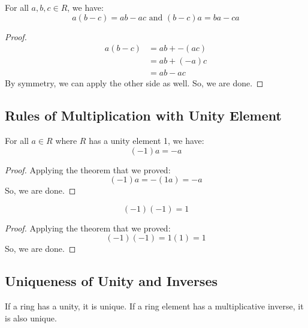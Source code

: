 \documentclass[letterpaper]{article}
\begin{document}
\begin{theorem}{}{}
    For all $a, b, c \in R$, we have: 
    \[a(b - c) = ab - ac \text{ and } (b - c)a = ba - ca\]
\end{theorem}

\begin{mdframed}[]
    \begin{proof}
        \begin{equation*}
            \begin{aligned}
                a(b - c) &= ab + -(ac) \\ 
                    &= ab + (-a)c \\ 
                    &= ab - ac
            \end{aligned}
        \end{equation*}
        By symmetry, we can apply the other side as well. So, we are done. 
    \end{proof}
\end{mdframed}

\subsection{Rules of Multiplication with Unity Element}
\begin{theorem}{}{}
    For all $a \in R$ where $R$ has a unity element 1, we have: 
    \[(-1)a = -a\]
\end{theorem}

\begin{mdframed}[]
    \begin{proof}
        Applying the theorem that we proved:
        \[(-1)a = -(1a) = -a\]
        So, we are done. 
    \end{proof}
\end{mdframed}

\begin{theorem}{}{}
    \[(-1)(-1) = 1\]
\end{theorem}

\begin{mdframed}[]
    \begin{proof}
        Applying the theorem that we proved:
        \[(-1)(-1) = 1(1) = 1\]
        So, we are done.
    \end{proof}
\end{mdframed}

\subsection{Uniqueness of Unity and Inverses}
\begin{theorem}{}{}
    If a ring has a unity, it is unique. If a ring element has a multiplicative inverse, it is also unique. 
\end{theorem}
\end{document}
